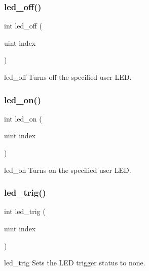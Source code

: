 \subsubsection{led\+\_\+off()}
{\footnotesize\ttfamily int led\+\_\+off (\begin{DoxyParamCaption}\item[{uint}]{index }\end{DoxyParamCaption})}

led\+\_\+off Turns off the specified user L\+ED. \mbox{\label{led_8c_a2d9d74d6de63682761865ba90761e340}} 
\subsubsection{led\+\_\+on()}
{\footnotesize\ttfamily int led\+\_\+on (\begin{DoxyParamCaption}\item[{uint}]{index }\end{DoxyParamCaption})}

led\+\_\+on Turns on the specified user L\+ED. \mbox{\label{led_8c_afae7e33a2ee9474e528d86a2a88a1242}} 
\subsubsection{led\+\_\+trig()}
{\footnotesize\ttfamily int led\+\_\+trig (\begin{DoxyParamCaption}\item[{uint}]{index }\end{DoxyParamCaption})}

led\+\_\+trig Sets the L\+ED trigger status to \textquotesingle{}none\textquotesingle{}. 